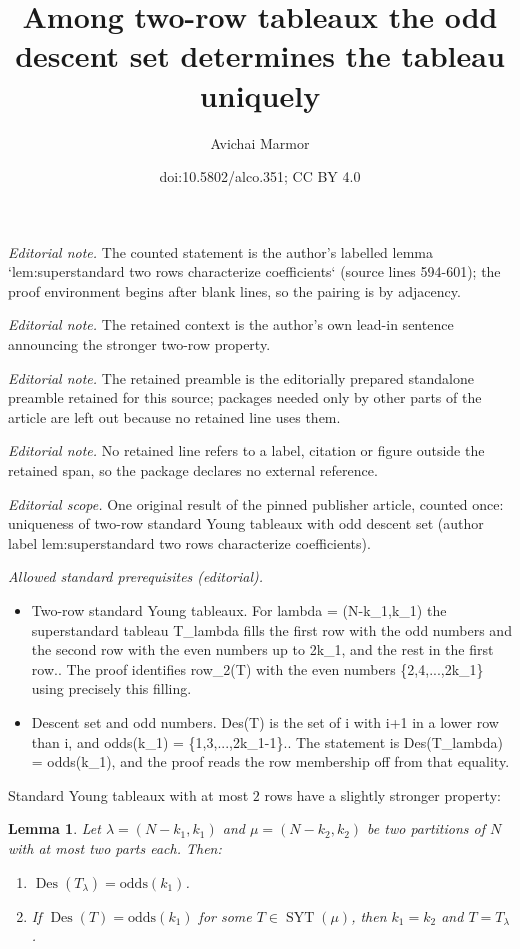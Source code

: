 \documentclass[11pt]{article}
\title{Among two-row tableaux the odd descent set determines the tableau uniquely}
\author{Avichai Marmor}
\date{doi:10.5802/alco.351; CC BY 4.0}
\newtheorem{lemma}[theo]{Lemma}
\theoremstyle{definition}
\numberwithin{equation}{section}
\newcommand{\Des}{\operatorname{Des}}
\newcommand{\Syt}{\operatorname{SYT}}
\newcommand{\odds}{\mathrm{odds}}
\begin{document}
\maketitle
\noindent\textit{Editorial note.} The counted statement is the author's labelled lemma `lem:superstandard two rows characterize coefficients` (source lines 594-601); the proof environment begins after blank lines, so the pairing is by adjacency.\par\medskip
\noindent\textit{Editorial note.} The retained context is the author's own lead-in sentence announcing the stronger two-row property.\par\medskip
\noindent\textit{Editorial note.} The retained preamble is the editorially prepared standalone preamble retained for this source; packages needed only by other parts of the article are left out because no retained line uses them.\par\medskip
\noindent\textit{Editorial note.} No retained line refers to a label, citation or figure outside the retained span, so the package declares no external reference.\par\medskip
\noindent\textit{Editorial scope.} One original result of the pinned publisher article, counted once: uniqueness of two-row standard Young tableaux with odd descent set (author label lem:superstandard two rows characterize coefficients).\par\medskip
\noindent\textit{Allowed standard prerequisites (editorial).}\begin{itemize}
\item Two-row standard Young tableaux. For lambda = (N-k\_1,k\_1) the superstandard tableau T\_lambda fills the first row with the odd numbers and the second row with the even numbers up to 2k\_1, and the rest in the first row.. The proof identifies row\_2(T) with the even numbers \{2,4,...,2k\_1\} using precisely this filling.
\item Descent set and odd numbers. Des(T) is the set of i with i+1 in a lower row than i, and odds(k\_1) = \{1,3,...,2k\_1-1\}.. The statement is Des(T\_lambda) = odds(k\_1), and the proof reads the row membership off from that equality.
\end{itemize}\medskip
Standard Young tableaux with at most $2$ rows have a slightly stronger property:

\begin{lemma}
\label{lem:superstandard two rows characterize coefficients}
    Let $\lambda = (N-k_1,k_1)$ and $\mu = (N-k_2,k_2)$ be two partitions of $N$ with at most two parts each. Then:
    \begin{enumerate}
        \item $\Des(T_\lambda) = \odds(k_1)$.
        \item If $\Des(T) = \odds(k_1)$ for some $T \in \Syt(\mu)$, then $k_1 = k_2$ and $T = T_\lambda$.
    \end{enumerate}
\end{lemma}
\end{document}
